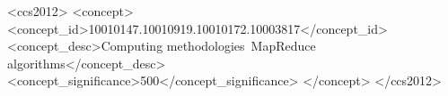 \documentclass[format=acmsmall, review=false, screen=true, table]{acmart}
\begin{document}
\begin{abstract}
\end{abstract}


%
%
\begin{CCSXML}
	<ccs2012>
	<concept>
	<concept_id>10010147.10010919.10010172.10003817</concept_id>
	<concept_desc>Computing methodologies~MapReduce algorithms</concept_desc>
	<concept_significance>500</concept_significance>
	</concept>
	</ccs2012>
\end{CCSXML}
\end{document}
